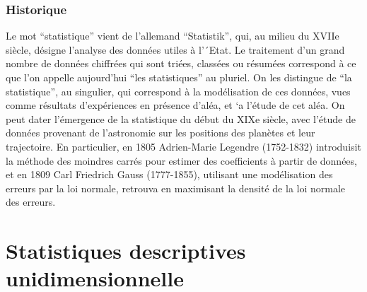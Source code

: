 \documentclass[10pt, french]{beamer}
\begin{document}
\begin{frame}\frametitle{Historique}
Le mot “statistique” vient de l’allemand “Statistik”, qui, au milieu du
XVIIe siècle, désigne l’analyse des données utiles à l’´Etat. Le
traitement d’un grand nombre de données chiffrées qui sont triées,
classées ou résumées correspond à ce que l’on appelle aujourd’hui “les
statistiques” au pluriel. On les distingue de “la statistique”, au singulier,
qui correspond à la modélisation de ces données, vues comme résultats
d’expériences en présence d’aléa, et `a l’étude de cet aléa. On peut dater
l’émergence de la statistique du début du XIXe siècle, avec l’étude de
données provenant de l’astronomie sur les positions des planètes et leur
trajectoire. En particulier, en 1805 Adrien-Marie Legendre (1752-1832)
introduisit la méthode des moindres carrés pour estimer des coefficients
à partir de données, et en 1809 Carl Friedrich Gauss (1777-1855),
utilisant une modélisation des erreurs par la loi normale, retrouva en
maximisant la densité de la loi normale des erreurs.
\end{frame}

\section{Statistiques descriptives unidimensionnelle}
\end{document}
